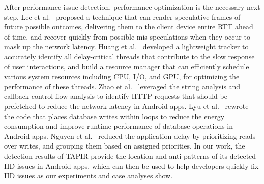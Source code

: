 After performance issue detection, performance optimization is the necessary next step. 
Lee et al.~\cite{lee2015outatime} proposed a technique that can render speculative frames of future possible outcomes, delivering them to the client device entire RTT ahead of time, and recover quickly from possible mis-speculations when they occur to mask up the network latency. 
Huang et al.~\cite{huang2017shuffledog} developed a lightweight tracker to accurately identify all delay-critical threads that contribute to the slow response of user interactions, and build a resource manager that can efficiently schedule various system resources including CPU, I/O, and GPU, for optimizing the performance of these threads. 
Zhao et al.~\cite{zhao2018leveraging} leveraged the string analysis and callback control flow analysis to identify HTTP requests that should be prefetched to reduce the network latency in Android apps. 
Lyu et al.~\cite{lyu2018remove} rewrote the code that places database writes within loops to reduce the energy consumption and improve runtime performance of database operations in Android apps. 
Nguyen et al.~\cite{nguyen2015reducing} reduced the application delay by prioritizing reads over writes, and grouping them based on assigned priorities. In our work, the detection results of TAPIR provide the location and anti-patterns of its detected IID issues in Android apps, which can then be used to help developers quickly fix IID issues as our experiments and case analyses show.